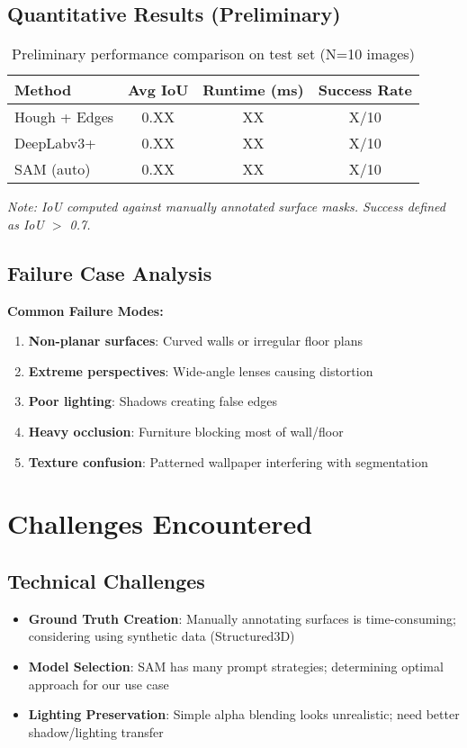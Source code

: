 \documentclass[11pt]{article}
\begin{document}
\subsection{Quantitative Results (Preliminary)}

\begin{table}[h]
\centering
\caption{Preliminary performance comparison on test set (N=10 images)}
\begin{tabular}{@{}lccc@{}}
\toprule
Method & Avg IoU & Runtime (ms) & Success Rate \\
\midrule
Hough + Edges & 0.XX & XX & X/10 \\
DeepLabv3+ & 0.XX & XX & X/10 \\
SAM (auto) & 0.XX & XX & X/10 \\
\bottomrule
\end{tabular}
\end{table}

\textit{Note: IoU computed against manually annotated surface masks. Success defined as IoU $>$ 0.7.}

\subsection{Failure Case Analysis}

\textbf{Common Failure Modes:}
\begin{enumerate}
    \item \textbf{Non-planar surfaces}: Curved walls or irregular floor plans
    \item \textbf{Extreme perspectives}: Wide-angle lenses causing distortion
    \item \textbf{Poor lighting}: Shadows creating false edges
    \item \textbf{Heavy occlusion}: Furniture blocking most of wall/floor
    \item \textbf{Texture confusion}: Patterned wallpaper interfering with segmentation
\end{enumerate}

\section{Challenges Encountered}

\subsection{Technical Challenges}
\begin{itemize}
    \item \textbf{Ground Truth Creation}: Manually annotating surfaces is time-consuming; considering using synthetic data (Structured3D)
    \item \textbf{Model Selection}: SAM has many prompt strategies; determining optimal approach for our use case
    \item \textbf{Lighting Preservation}: Simple alpha blending looks unrealistic; need better shadow/lighting transfer
\end{itemize}
\end{document}
